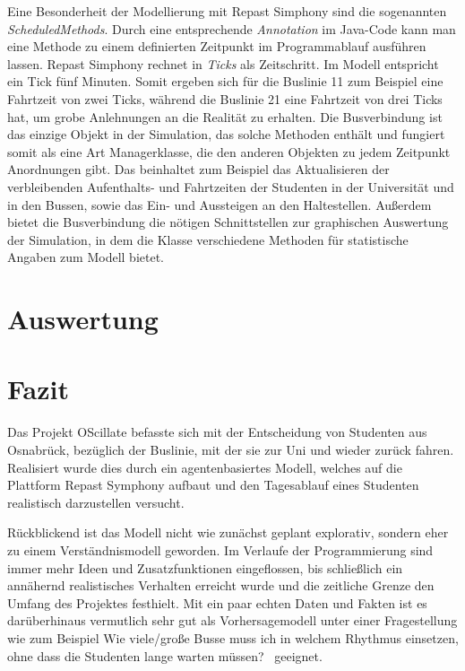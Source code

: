 \documentclass[12pt,a4paper]{scrartcl}
\begin{document}
Eine Besonderheit der Modellierung mit Repast Simphony sind die sogenannten \textit{ScheduledMethods}. Durch eine entsprechende \textit{Annotation} im Java-Code kann man eine Methode zu einem definierten Zeitpunkt im Programmablauf ausführen lassen. Repast Simphony rechnet in \textit{Ticks} als Zeitschritt. Im Modell entspricht ein Tick fünf Minuten. Somit ergeben sich für die Buslinie 11 zum Beispiel eine Fahrtzeit von zwei Ticks, während die Buslinie 21 eine Fahrtzeit von drei Ticks hat, um grobe Anlehnungen an die Realität zu erhalten. Die Busverbindung ist das einzige Objekt in der Simulation, das solche Methoden enthält und fungiert somit als eine Art Managerklasse, die den anderen Objekten zu jedem Zeitpunkt Anordnungen gibt. Das beinhaltet zum Beispiel das Aktualisieren der verbleibenden Aufenthalts- und Fahrtzeiten der Studenten in der Universität und in den Bussen, sowie das Ein- und Aussteigen an den Haltestellen. Außerdem bietet die Busverbindung die nötigen Schnittstellen zur graphischen Auswertung der Simulation, in dem die Klasse verschiedene Methoden für statistische Angaben zum Modell bietet. 

\section{Auswertung}\label{erg}

\section{Fazit}\label{fazit}
Das Projekt OScillate befasste sich mit der Entscheidung von Studenten aus Osnabrück, bezüglich der Buslinie, mit der sie zur Uni und wieder zurück fahren. Realisiert wurde dies durch ein agentenbasiertes Modell, welches auf die Plattform Repast Symphony aufbaut und den Tagesablauf eines Studenten realistisch darzustellen versucht. 

Rückblickend ist das Modell nicht wie zunächst geplant explorativ, sondern eher zu einem Verständnismodell geworden. Im Verlaufe der Programmierung sind immer mehr Ideen und Zusatzfunktionen eingeflossen, bis schließlich ein annähernd realistisches Verhalten erreicht wurde und die zeitliche Grenze den Umfang des Projektes festhielt. Mit ein paar echten Daten und Fakten ist es darüberhinaus vermutlich sehr gut als Vorhersagemodell unter einer Fragestellung wie zum Beispiel \glqq Wie viele/große Busse muss ich in welchem Rhythmus einsetzen, ohne dass die Studenten lange warten müssen?\grqq~ geeignet. 
\end{document}
